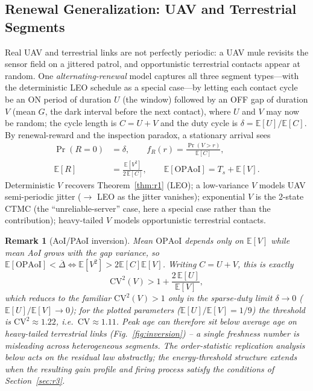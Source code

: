 \documentclass[twocolumn,3p,times,procedia]{elsarticle}
\newtheorem{remark}{Remark}
\newcommand{\AoI}{\Delta}
\newcommand{\OPAoI}{\mathrm{OPAoI}}
\newcommand{\E}{\mathbb{E}}
\begin{document}
\subsection{Renewal Generalization: UAV and Terrestrial
Segments}\label{sec:renewal}
Real UAV and terrestrial links are not perfectly periodic: a UAV mule
revisits the sensor field on a jittered patrol, and opportunistic
terrestrial contacts appear at random. One \emph{alternating-renewal}
model captures all three segment types---with the deterministic LEO
schedule as a special case---by letting each contact cycle be an ON
period of duration $U$ (the window) followed by an OFF gap of duration
$V$ (mean $G$, the dark interval before the next contact), where $U$ and
$V$ may now be random; the cycle length is $C=U+V$ and the duty cycle is
$\delta=\mathbb E[U]/\mathbb E[C]$. By renewal-reward and the inspection
paradox, a stationary arrival sees
\begin{equation}\label{eq:renewal}
\begin{aligned}
\Pr(R{=}0)&=\delta,\qquad f_R(r)=\frac{\Pr(V>r)}{\mathbb E[C]},\\
\E[R]&=\frac{\E[V^2]}{2\,\E[C]},\qquad \E[\OPAoI]=T_s+\E[V].
\end{aligned}
\end{equation}
Deterministic $V$ recovers Theorem~\ref{thm:r1} (LEO); a low-variance $V$
models UAV semi-periodic jitter ($\to$ LEO as the jitter vanishes);
exponential $V$ is the 2-state CTMC (the ``unreliable-server'' case, here
a special case rather than the contribution); heavy-tailed $V$ models
opportunistic terrestrial contacts.

\begin{remark}[AoI/PAoI inversion]\label{rem:inversion}
Mean $\OPAoI$ depends only on $\E[V]$ while mean AoI grows with the gap
variance, so
$\E[\OPAoI]<\overline{\AoI}\iff \E[V^2]>2\E[C]\E[V]$. Writing
$C=U+V$, this is exactly
\begin{equation}\label{eq:invcond}
\mathrm{CV}^2(V)>1+\frac{2\,\E[U]}{\E[V]},
\end{equation}
which reduces to the familiar $\mathrm{CV}^2(V)>1$ only in the sparse-duty
limit $\delta\to0$ ($\E[U]/\E[V]\to0$); for the plotted parameters
($\E[U]/\E[V]=1/9$) the threshold is $\mathrm{CV}^2\approx1.22$, i.e.\
$\mathrm{CV}\approx1.11$. Peak age can therefore sit
\emph{below} average age on heavy-tailed terrestrial links
(Fig.~\ref{fig:inversion}) -- a single freshness number is misleading
across heterogeneous segments. The order-statistic replication analysis below acts on the residual
law abstractly; the energy-threshold structure extends when the
resulting gain profile and firing process satisfy the conditions of
Section~\ref{sec:r3}.
\end{remark}
\end{document}

